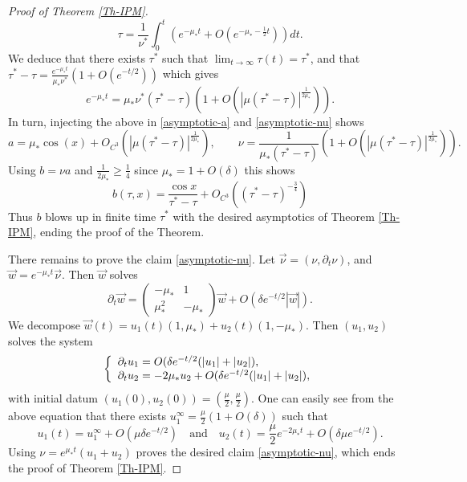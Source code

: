 \documentclass[12pt]{amsart}
\numberwithin{equation}{section}
\numberwithin{equation}{section}
\begin{document}
\begin{proof}[Proof of Theorem \ref{Th-IPM}]
$$
\tau = \frac{1}{\nu^*} \int_0^t \left( e^{-\mu_* t}+O(e^{-\mu_*-\frac 12 t})\right) dt .
$$
We deduce that there exists $\tau^*$ such that $\lim_{t\to \infty}\tau(t)=\tau^*$, and that $\tau^*-\tau= \frac{e^{-\mu_* t}}{\mu_*\nu^*}(1+O(e^{-t/2}))$ which gives
$$
e^{-\mu_* t}=\mu_*\nu^* (\tau^*-\tau)\left( 1+ O\left(|\mu (\tau^*-\tau)|^{\frac{1}{2\mu_*}} \right) \right).
$$
In turn, injecting the above in \eqref{asymptotic-a} and \eqref{asymptotic-nu} shows
$$
a=\mu_* \cos(x)+O_{C^3}\left(|\mu (\tau^*-\tau)|^{\frac{1}{2\mu_*}} \right)  ,  \qquad \nu =\frac{1}{\mu_* (\tau^*-\tau)}\left( 1+ O\left(|\mu (\tau^*-\tau)|^{\frac{1}{2\mu_*}} \right) \right).
$$
Using $b=\nu a$ and $\frac{1}{2\mu_*}\geq \frac 14$ since $\mu_*=1+O(\delta)$ this shows
$$
b(\tau,x)= \frac{\cos x}{\tau^*-\tau}+O_{C^3}\left( (\tau^{*}-\tau)^{-\frac 34} \right)
$$
Thus $b$ blows up in finite time $\tau^*$ with the desired asymptotics of Theorem \ref{Th-IPM}, ending the proof of the Theorem.


There remains to prove the claim \eqref{asymptotic-nu}. Let $\vec \nu=(\nu,\partial_t \nu)$, and $\vec w=e^{-\mu_* t}\vec \nu$. Then $\vec w$ solves
$$
\partial_t \vec w = \begin{pmatrix} -\mu_* & 1 \\ \mu_{*}^2 & -\mu_* \end{pmatrix} \vec w + O(\delta e^{-t/2}|\vec w|).
$$
We decompose $\vec w(t) = u_1(t) (1,\mu_*)+u_2(t)(1,-\mu_*)$. Then $(u_1,u_2)$ solves the system
$$
\left\{
\begin{array}{l l}
\partial_t u_1 = O(\delta e^{-t/2}(|u_1|+|u_2|), \\
\partial_t u_2 =-2\mu_* u_2+ O(\delta e^{-t/2}(|u_1|+|u_2|),
\end{array}
\right.
$$
with initial datum $(u_{1}(0),u_2(0))=(\frac{\mu}{2},\frac{\mu}{2})$. One can easily see from the above equation that there exists $u_{1}^\infty =\frac{\mu}{2}(1+O(\delta))$ such that
$$
u_1(t)= u_1^\infty +O(\mu \delta e^{-t/2}) \quad \mbox{and} \quad u_2(t)=\frac{\mu}{2} e^{-2\mu_* t}+O(\delta \mu e^{-t/2}).
$$
Using $\nu = e^{\mu_* t} (u_1+u_2)$ proves the desired claim \eqref{asymptotic-nu}, which ends the proof of Theorem \ref{Th-IPM}.
\end{proof}

\bigbreak
\bigbreak
\end{document}
